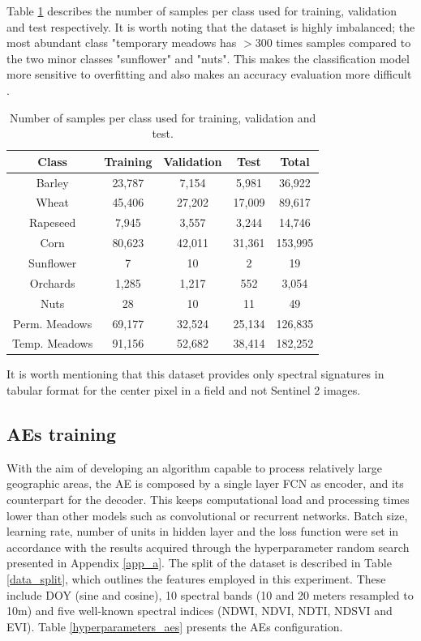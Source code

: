 \documentclass[journal,article,submit,pdftex,moreauthors]{Definitions/mdpi}
\begin{document}
Table \ref{samples} describes the number of samples per class used for training, validation and test respectively.
It is worth noting that the dataset is highly imbalanced; the most abundant class "temporary meadows has $> 300$ times samples compared to the two minor classes "sunflower" and "nuts". This makes the classification model more sensitive to overfitting and also makes an accuracy evaluation more difficult \cite{Foody2002}.

\begin{table}[H]
	\centering
	\caption{Number of samples per class used for training, validation and test.}
	\small
	\begin{tabular}{c c c c c}
		\hline
		Class			& Training		& Validation 	& Test 		& Total \\
		\hline
		Barley			& 23,787		& 7,154			& 5,981		& 36,922 \\
		Wheat			& 45,406		& 27,202		& 17,009	& 89,617 \\
		Rapeseed		& 7,945			& 3,557			& 3,244		& 14,746 \\
		Corn			& 80,623		& 42,011		& 31,361	& 153,995 \\
		Sunflower		& 7				& 10			& 2			& 19 \\
		Orchards		& 1,285			& 1,217			& 552		& 3,054 \\
		Nuts			& 28			& 10			& 11		& 49 \\
		Perm. Meadows	& 69,177		& 32,524		& 25,134	& 126,835 \\
		Temp. Meadows	& 91,156		& 52,682		& 38,414	& 182,252 \\
		\hline
	\end{tabular}
	\label{samples}
\end{table}
It is worth mentioning that this dataset provides only spectral signatures in tabular format for the center pixel in a field and not Sentinel 2 images. 
\subsection{\ac{AEs} training}
With the aim of developing an algorithm capable to process relatively large geographic areas, the AE is composed by a single layer \ac{FCN} as encoder, and its counterpart for the decoder.
This keeps computational load and processing times lower than other models such as convolutional or recurrent networks.
Batch size, learning rate, number of units in hidden layer and the loss function were set in accordance with the results acquired through the hyperparameter random search presented in Appendix \ref{app_a}.
The split of the dataset is described in Table \ref{data_split}, which outlines the features employed in this experiment. These include \ac{DOY} (sine and cosine), 10 spectral bands (10 and 20 meters resampled to 10m) and five well-known spectral indices (\ac{NDWI}, \ac{NDVI}, \ac{NDTI}, \ac{NDSVI} and \ac{EVI}). Table \ref{hyperparameters_aes} presents the \ac{AEs} configuration.
\end{document}
